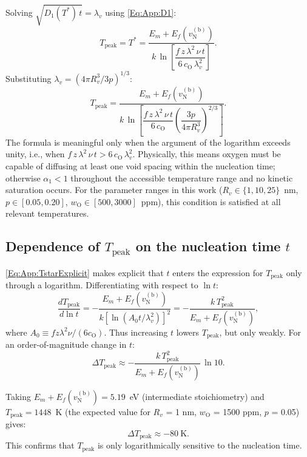 \documentclass[preprint,12pt,sort&compress]{elsarticle}
\newcommand{\?}{\stackrel{?}{=}}
\begin{document}
Solving $\sqrt{D_1(T^*)\,t} = \lambda_v$ using \cref{Eq:App:D1}:
\begin{equation}
T_\text{peak} = T^* = \frac{E_m + E_f(v_\text{N}^{(\text{b})})}{k\,\ln\!\left[\dfrac{f\,z\,\lambda^2\,\nu\,t}{6\,c_\text{O}\,\lambda_v^2}\right]}.
\label{Eq:App:TstarFormula}
\end{equation}
Substituting $\lambda_v = (4\pi R_v^3 / 3p)^{1/3}$:
\begin{equation}
T_\text{peak} = \frac{E_m + E_f(v_\text{N}^{(\text{b})})}{k\,\ln\!\left[\dfrac{f\,z\,\lambda^2\,\nu\,t}{6\,c_\text{O}}\left(\dfrac{3p}{4\pi R_v^3}\right)^{2/3}\right]}.
\label{Eq:App:TstarExplicit}
\end{equation}
The formula is meaningful only when the argument of the logarithm exceeds unity, i.e., when $f\,z\,\lambda^2\,\nu\,t > 6\,c_\text{O}\,\lambda_v^2$. Physically, this means oxygen must be capable of diffusing at least one void spacing within the nucleation time; otherwise $\alpha_1 < 1$ throughout the accessible temperature range and no kinetic saturation occurs. For the parameter ranges in this work ($R_v \in \{1, 10, 25\}$~nm, $p \in [0.05, 0.20]$, $w_\text{O} \in [500, 3000]$~ppm), this condition is satisfied at all relevant temperatures.

\subsection{Dependence of \texorpdfstring{$T_\text{peak}$}{Tpeak} on the nucleation time \texorpdfstring{$t$}{t}}
\label{App:Tpeak:tdep}

\cref{Eq:App:TstarExplicit} makes explicit that $t$ enters the expression for $T_\text{peak}$ only through a logarithm. Differentiating with respect to $\ln t$:
\begin{equation}
\frac{dT_\text{peak}}{d\ln t}
=
-\frac{E_m + E_f(v_\text{N}^{(\text{b})})}{
k\left[\ln\!\left(A_0 t / \lambda_v^2\right)\right]^2
}
=
-\frac{k\,T_\text{peak}^2}{E_m + E_f(v_\text{N}^{(\text{b})})},
\label{Eq:App:dTpeak_dlogt}
\end{equation}
where $A_0 \equiv f z \lambda^2 \nu / (6 c_\text{O})$. Thus increasing $t$ lowers $T_\text{peak}$, but only weakly. For an order-of-magnitude change in $t$:
\begin{equation}
\Delta T_\text{peak}
\approx
-\frac{k\,T_\text{peak}^2}{E_m + E_f(v_\text{N}^{(\text{b})})}\,\ln 10.
\label{Eq:App:deltaTpeak}
\end{equation}

Taking $E_m + E_f(v_\text{N}^{(\text{b})}) = 5.19$~eV (intermediate stoichiometry) and $T_\text{peak} = 1448$~K (the expected value for $R_v$ = 1 nm, $w_\text{O}$ = 1500 ppm, $p$ = 0.05) gives:
\begin{equation}
\Delta T_\text{peak} \approx -80~\text{K}.
\end{equation}
This confirms that $T_\text{peak}$ is only logarithmically sensitive to the nucleation time.
\end{document}
